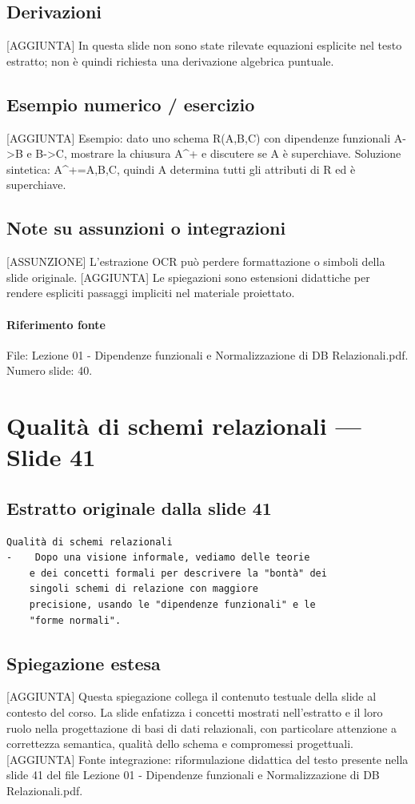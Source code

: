 \documentclass[11pt]{article}
\begin{document}
\subsection*{Derivazioni}
[AGGIUNTA] In questa slide non sono state rilevate equazioni esplicite nel testo estratto; non è quindi richiesta una derivazione algebrica puntuale.
\subsection*{Esempio numerico / esercizio}
[AGGIUNTA] Esempio: dato uno schema R(A,B,C) con dipendenze funzionali A->B e B->C, mostrare la chiusura A^+ e discutere se A è superchiave. Soluzione sintetica: A^+={A,B,C}, quindi A determina tutti gli attributi di R ed è superchiave.
\subsection*{Note su assunzioni o integrazioni}
[ASSUNZIONE] L'estrazione OCR può perdere formattazione o simboli della slide originale.
[AGGIUNTA] Le spiegazioni sono estensioni didattiche per rendere espliciti passaggi impliciti nel materiale proiettato.
\paragraph{Riferimento fonte} File: Lezione 01 - Dipendenze funzionali e Normalizzazione di DB Relazionali.pdf. Numero slide: 40.
\section{Qualità di schemi relazionali --- Slide 41}
\subsection*{Estratto originale dalla slide 41}
\begin{lstlisting}
Qualità di schemi relazionali
-    Dopo una visione informale, vediamo delle teorie
    e dei concetti formali per descrivere la "bontà" dei
    singoli schemi di relazione con maggiore
    precisione, usando le "dipendenze funzionali" e le
    "forme normali".
\end{lstlisting}
\subsection*{Spiegazione estesa}
[AGGIUNTA] Questa spiegazione collega il contenuto testuale della slide al contesto del corso. La slide enfatizza i concetti mostrati nell'estratto e il loro ruolo nella progettazione di basi di dati relazionali, con particolare attenzione a correttezza semantica, qualità dello schema e compromessi progettuali.
[AGGIUNTA] Fonte integrazione: riformulazione didattica del testo presente nella slide 41 del file Lezione 01 - Dipendenze funzionali e Normalizzazione di DB Relazionali.pdf.
\end{document}
